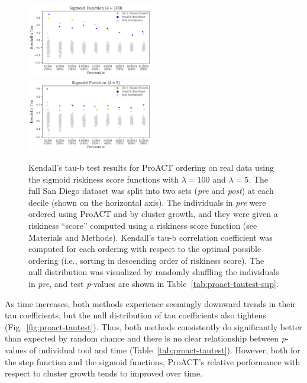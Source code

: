 \begin{figure} %
\centering
\includegraphics[width=0.495\textwidth]{figs/proact-tautest-L100}
\includegraphics[width=0.495\textwidth]{figs/proact-tautest-L5}
\caption[Kendall's Tau-b Test \textit{p}-Values (Sigmoid Functions)]
{Kendall's tau-b test results for ProACT ordering on real data using the sigmoid riskiness score functions with $\lambda=100$ and $\lambda=5$. The full San Diego dataset was split into two sets (\textit{pre} and \textit{post}) at each decile (shown on the horizontal axis). The individuals in \textit{pre} were ordered using ProACT and by cluster growth, and they were given a riskiness ``score'' computed using a riskiness score function (see Materials and Methods). Kendall's tau-b correlation coefficient was computed for each ordering with respect to the optimal possible ordering (i.e., sorting in descending order of riskiness score). The null distribution was visualized by randomly shuffling the individuals in \textit{pre}, and test \textit{p}-values are shown in Table~\ref{tab:proact-tautest-sup}.}
\label{fig:proact-tautest-sup}
\end{figure}

As time increases, both methods experience seemingly downward trends in their tau coefficients, but the null distribution of tau coefficients also tightens  (Fig.~\ref{fig:proact-tautest}). Thus, both methods consistently do significantly better than expected by random chance and there is no clear relationship between \textit{p}-values of individual tool and time (Table~\ref{tab:proact-tautest}). However, both for the step function and the sigmoid functions, ProACT's relative performance with respect to cluster growth tends to improved over time.

